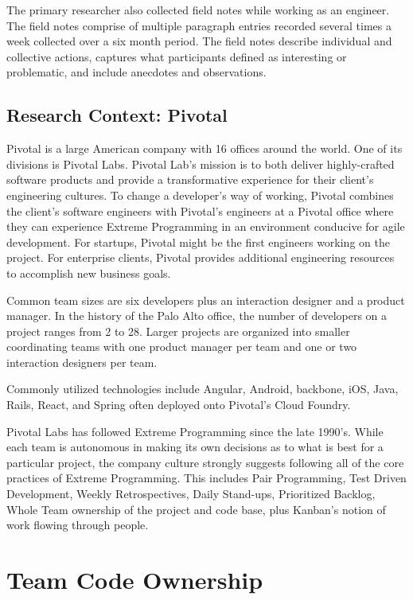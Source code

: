 The primary researcher also collected field notes while working as an engineer. The field notes comprise of multiple paragraph entries recorded several times a week collected over a six month period. The field notes describe individual and collective actions, captures what participants defined as interesting or problematic, and include anecdotes and observations. 

\subsection{Research Context: Pivotal}
\label{ResearchContext}
Pivotal is a large American company with 16 offices around the world. One of its divisions is Pivotal Labs. Pivotal Lab's mission is to both deliver highly-crafted software products and provide a transformative experience for their client's engineering cultures. To change a developer's way of working, Pivotal combines the client's software engineers with Pivotal's engineers at a Pivotal office where they can experience Extreme Programming in an environment conducive for agile development. For startups, Pivotal might be the first engineers working on the project. For enterprise clients, Pivotal provides additional engineering resources to accomplish new business goals. 

Common team sizes are six developers plus an interaction designer and a product manager. In the history of the Palo Alto office, the number of developers on a project ranges from 2 to 28. Larger projects are organized into smaller coordinating teams with one product manager per team and one or two interaction designers per team.

Commonly utilized technologies include Angular, Android, backbone, iOS, Java, Rails, React, and Spring often deployed onto Pivotal's Cloud Foundry. 

Pivotal Labs has followed Extreme Programming \cite{ExtremeProgramming2004} since the late 1990's. While each team is autonomous in making its own decisions as to what is best for a particular project, the company culture strongly suggests following all of the core practices of Extreme Programming. This includes Pair Programming, Test Driven Development, Weekly Retrospectives, Daily Stand-ups, Prioritized Backlog, Whole Team ownership of the project and code base, plus Kanban's notion of work flowing through people.

\section{Team Code Ownership}
\label{TeamCodeOwnership}

